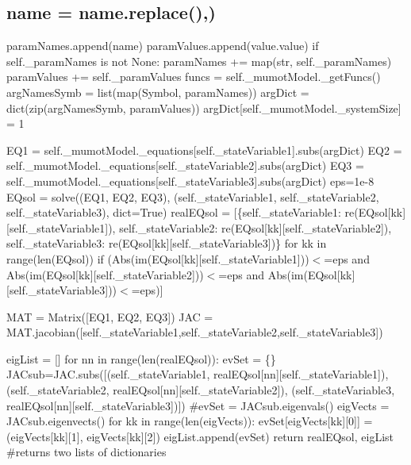 \subsection*{name = name.\+replace(\textquotesingle{})\textquotesingle{},\textquotesingle{}\textquotesingle{})}

param\+Names.\+append(name) param\+Values.\+append(value.\+value) if self.\+\_\+param\+Names is not None\+: param\+Names += map(str, self.\+\_\+param\+Names) param\+Values += self.\+\_\+param\+Values funcs = self.\+\_\+mumot\+Model.\+\_\+get\+Funcs() arg\+Names\+Symb = list(map(\+Symbol, param\+Names)) arg\+Dict = dict(zip(arg\+Names\+Symb, param\+Values)) arg\+Dict\mbox{[}self.\+\_\+mumot\+Model.\+\_\+system\+Size\mbox{]} = 1

E\+Q1 = self.\+\_\+mumot\+Model.\+\_\+equations\mbox{[}self.\+\_\+state\+Variable1\mbox{]}.subs(arg\+Dict) E\+Q2 = self.\+\_\+mumot\+Model.\+\_\+equations\mbox{[}self.\+\_\+state\+Variable2\mbox{]}.subs(arg\+Dict) E\+Q3 = self.\+\_\+mumot\+Model.\+\_\+equations\mbox{[}self.\+\_\+state\+Variable3\mbox{]}.subs(arg\+Dict) eps=1e-\/8 E\+Qsol = solve((E\+Q1, E\+Q2, E\+Q3), (self.\+\_\+state\+Variable1, self.\+\_\+state\+Variable2, self.\+\_\+state\+Variable3), dict=True) real\+E\+Qsol = \mbox{[}\{self.\+\_\+state\+Variable1\+: re(E\+Qsol\mbox{[}kk\mbox{]}\mbox{[}self.\+\_\+state\+Variable1\mbox{]}), self.\+\_\+state\+Variable2\+: re(E\+Qsol\mbox{[}kk\mbox{]}\mbox{[}self.\+\_\+state\+Variable2\mbox{]}), self.\+\_\+state\+Variable3\+: re(E\+Qsol\mbox{[}kk\mbox{]}\mbox{[}self.\+\_\+state\+Variable3\mbox{]})\} for kk in range(len(\+E\+Qsol)) if (Abs(im(E\+Qsol\mbox{[}kk\mbox{]}\mbox{[}self.\+\_\+state\+Variable1\mbox{]}))$<$=eps and Abs(im(E\+Qsol\mbox{[}kk\mbox{]}\mbox{[}self.\+\_\+state\+Variable2\mbox{]}))$<$=eps and Abs(im(E\+Qsol\mbox{[}kk\mbox{]}\mbox{[}self.\+\_\+state\+Variable3\mbox{]}))$<$=eps)\mbox{]}

M\+AT = Matrix(\mbox{[}\+E\+Q1, E\+Q2, E\+Q3\mbox{]}) J\+AC = M\+A\+T.\+jacobian(\mbox{[}self.\+\_\+state\+Variable1,self.\+\_\+state\+Variable2,self.\+\_\+state\+Variable3\mbox{]})

eig\+List = \mbox{[}\mbox{]} for nn in range(len(real\+E\+Qsol))\+: ev\+Set = \{\} J\+A\+Csub=J\+A\+C.\+subs(\mbox{[}(self.\+\_\+state\+Variable1, real\+E\+Qsol\mbox{[}nn\mbox{]}\mbox{[}self.\+\_\+state\+Variable1\mbox{]}), (self.\+\_\+state\+Variable2, real\+E\+Qsol\mbox{[}nn\mbox{]}\mbox{[}self.\+\_\+state\+Variable2\mbox{]}), (self.\+\_\+state\+Variable3, real\+E\+Qsol\mbox{[}nn\mbox{]}\mbox{[}self.\+\_\+state\+Variable3\mbox{]})\mbox{]}) \#ev\+Set = J\+A\+Csub.\+eigenvals() eig\+Vects = J\+A\+Csub.\+eigenvects() for kk in range(len(eig\+Vects))\+: ev\+Set\mbox{[}eig\+Vects\mbox{[}kk\mbox{]}\mbox{[}0\mbox{]}\mbox{]} = (eig\+Vects\mbox{[}kk\mbox{]}\mbox{[}1\mbox{]}, eig\+Vects\mbox{[}kk\mbox{]}\mbox{[}2\mbox{]}) eig\+List.\+append(ev\+Set) return real\+E\+Qsol, eig\+List \#returns two lists of dictionaries 

